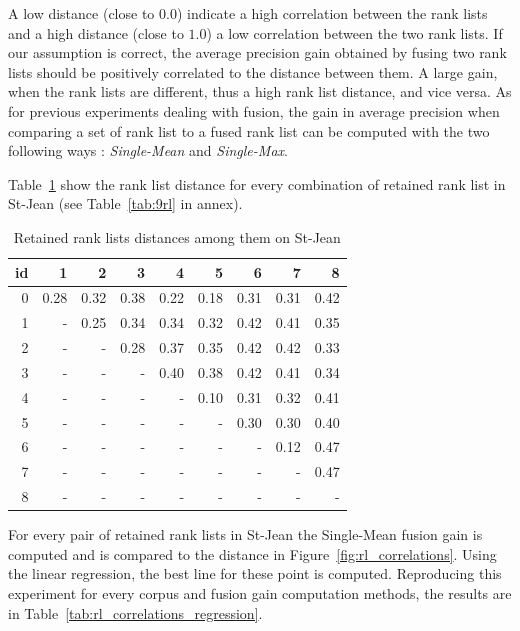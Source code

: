 A low distance (close to $0.0$) indicate a high correlation between the rank lists and a high distance (close to $1.0$) a low correlation between the two rank lists.
If our assumption is correct, the average precision gain obtained by fusing two rank lists should be positively correlated to the distance between them.
A large gain, when the rank lists are different, thus a high rank list distance, and vice versa.
As for previous experiments dealing with fusion, the gain in average precision when comparing a set of rank list to a fused rank list can be computed with the two following ways : \textit{Single-Mean} and \textit{Single-Max}.

Table~\ref{tab:rl_correlations} show the rank list distance for every combination of retained rank list in St-Jean (see Table~\ref{tab:9rl} in annex).

\begin{table}
  \centering
  \caption{Retained rank lists distances among them on St-Jean}
  \label{tab:rl_correlations}
  \begin{tabular}{r|r r r r r r r r}
    \toprule
    id &    1 &    2 &    3 &    4 &    5 &    6 &    7 &    8 \\
    \midrule
    0  & 0.28 & 0.32 & 0.38 & 0.22 & 0.18 & 0.31 & 0.31 & 0.42 \\
    1  &    - & 0.25 & 0.34 & 0.34 & 0.32 & 0.42 & 0.41 & 0.35 \\
    2  &    - &    - & 0.28 & 0.37 & 0.35 & 0.42 & 0.42 & 0.33 \\
    3  &    - &    - &    - & 0.40 & 0.38 & 0.42 & 0.41 & 0.34 \\
    4  &    - &    - &    - &    - & 0.10 & 0.31 & 0.32 & 0.41 \\
    5  &    - &    - &    - &    - &    - & 0.30 & 0.30 & 0.40 \\
    6  &    - &    - &    - &    - &    - &    - & 0.12 & 0.47 \\
    7  &    - &    - &    - &    - &    - &    - &    - & 0.47 \\
    8  &    - &    - &    - &    - &    - &    - &    - &    - \\
    \bottomrule
  \end{tabular}
\end{table}

For every pair of retained rank lists in St-Jean the Single-Mean fusion gain is computed and is compared to the distance in Figure~\ref{fig:rl_correlations}.
Using the linear regression, the best line for these point is computed.
Reproducing this experiment for every corpus and fusion gain computation methods, the results are in Table~\ref{tab:rl_correlations_regression}.

